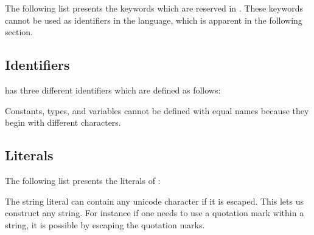 The following list presents the keywords which are reserved in
\productname{}. These keywords cannot be used as identifiers in the language,
which is apparent in the following section.

\begin{ebnf}
\end{ebnf}

\subsection{Identifiers}
\label{sec:identifiers}

\productname{} has three different identifiers which are defined as follows:

\begin{ebnf}
\end{ebnf}

Constants, types, and variables cannot be defined with equal names because
they begin with different characters. 

\subsection{Literals}

The following list presents the literals of \productname{}:

\begin{ebnf}
\end{ebnf}

The string literal can contain any unicode character if it is escaped. This lets
us construct any string. For instance if one needs to use a quotation mark
within a string, it is possible by escaping the quotation marks.

\begin{ebnf}
\end{ebnf}


